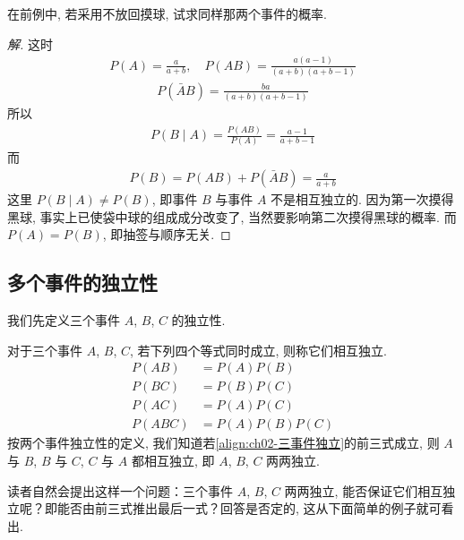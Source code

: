 \documentclass[../../main.tex]{subfiles}
\begin{document}
\begin{example}[不放回摸球]\label{example:ch02-不放回摸球}
在前例中, 若采用不放回摸球, 试求同样那两个事件的概率.

\begin{proof}[解]
这时
\begin{align*}
P(A)=\frac{a}{a+b},\quad P(AB)=\frac{a(a-1)}{(a+b)(a+b-1)}
\end{align*}
\begin{align*}
P(\bar{A}B)=\frac{ba}{(a+b)(a+b-1)}
\end{align*}
所以
\begin{align*}
P(B\mid A)=\frac{P(AB)}{P(A)}=\frac{a-1}{a+b-1}
\end{align*}
而
\begin{align*}
P(B)=P(AB)+P(\bar{A}B)=\frac{a}{a+b}
\end{align*}
这里 $P(B\mid A)\neq P(B)$, 即事件 $B$ 与事件 $A$ 不是相互独立的. 因为第一次摸得黑球, 事实上已使袋中球的组成成分改变了, 当然要影响第二次摸得黑球的概率. 而 $P(A)=P(B)$, 即抽签与顺序无关.
\end{proof}
\end{example}

\subsection{多个事件的独立性}

我们先定义三个事件 $A$, $B$, $C$ 的独立性.

\begin{definition}[三个事件的独立性]\label{definition:ch02-三事件独立性}
对于三个事件 $A$, $B$, $C$, 若下列四个等式同时成立, 则称它们相互独立.
\begin{subequations}\label{align:ch02-三事件独立}
\begin{align}
P(AB)&=P(A)P(B)\\
P(BC)&=P(B)P(C)\\
P(AC)&=P(A)P(C)\\
P(ABC)&=P(A)P(B)P(C)
\end{align}
\end{subequations}
按两个事件独立性的定义, 我们知道若\eqref{align:ch02-三事件独立}的前三式成立, 则 $A$ 与 $B$, $B$ 与 $C$, $C$ 与 $A$ 都相互独立, 即 $A$, $B$, $C$ 两两独立.
\end{definition}

读者自然会提出这样一个问题：三个事件 $A$, $B$, $C$ 两两独立, 能否保证它们相互独立呢？即能否由前三式推出最后一式？回答是否定的, 这从下面简单的例子就可看出.
\end{document}
